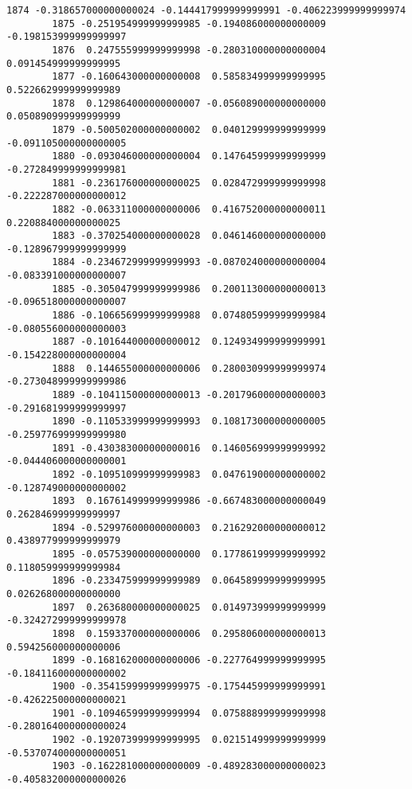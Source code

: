 \documentclass[11pt]{article}
\begin{document}
\begin{Verbatim}[commandchars=\\\{\}]
        1874 -0.318657000000000024 -0.144417999999999991 -0.406223999999999974   
        1875 -0.251954999999999985 -0.194086000000000009 -0.198153999999999997   
        1876  0.247555999999999998 -0.280310000000000004  0.091454999999999995   
        1877 -0.160643000000000008  0.585834999999999995  0.522662999999999989   
        1878  0.129864000000000007 -0.056089000000000000  0.050890999999999999   
        1879 -0.500502000000000002  0.040129999999999999 -0.091105000000000005   
        1880 -0.093046000000000004  0.147645999999999999 -0.272849999999999981   
        1881 -0.236176000000000025  0.028472999999999998 -0.222287000000000012   
        1882 -0.063311000000000006  0.416752000000000011  0.220884000000000025   
        1883 -0.370254000000000028  0.046146000000000000 -0.128967999999999999   
        1884 -0.234672999999999993 -0.087024000000000004 -0.083391000000000007   
        1885 -0.305047999999999986  0.200113000000000013 -0.096518000000000007   
        1886 -0.106656999999999988  0.074805999999999984 -0.080556000000000003   
        1887 -0.101644000000000012  0.124934999999999991 -0.154228000000000004   
        1888  0.144655000000000006  0.280030999999999974 -0.273048999999999986   
        1889 -0.104115000000000013 -0.201796000000000003 -0.291681999999999997   
        1890 -0.110533999999999993  0.108173000000000005 -0.259776999999999980   
        1891 -0.430383000000000016  0.146056999999999992 -0.044406000000000001   
        1892 -0.109510999999999983  0.047619000000000002 -0.128749000000000002   
        1893  0.167614999999999986 -0.667483000000000049  0.262846999999999997   
        1894 -0.529976000000000003  0.216292000000000012  0.438977999999999979   
        1895 -0.057539000000000000  0.177861999999999992  0.118059999999999984   
        1896 -0.233475999999999989  0.064589999999999995  0.026268000000000000   
        1897  0.263680000000000025  0.014973999999999999 -0.324272999999999978   
        1898  0.159337000000000006  0.295806000000000013  0.594256000000000006   
        1899 -0.168162000000000006 -0.227764999999999995 -0.184116000000000002   
        1900 -0.354159999999999975 -0.175445999999999991 -0.426225000000000021   
        1901 -0.109465999999999994  0.075888999999999998 -0.280164000000000024   
        1902 -0.192073999999999995  0.021514999999999999 -0.537074000000000051   
        1903 -0.162281000000000009 -0.489283000000000023 -0.405832000000000026   
        

\end{Verbatim}
\end{document}
